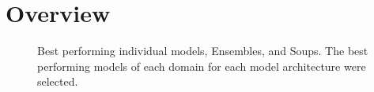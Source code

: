 \FloatBarrier
\section{Overview}
\begin{figure}[ht!]
    \centering
    
    
    \caption{Best performing individual models, Ensembles, and Soups. The best performing models of each domain for each model architecture were selected.}
    \label{fig:res:best_models}
\end{figure}

